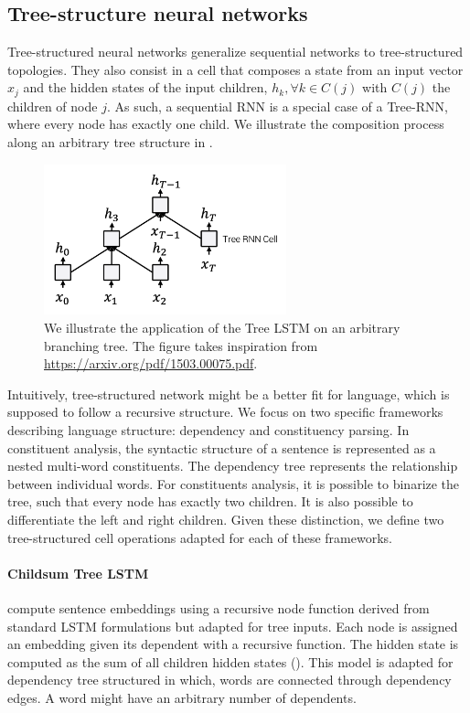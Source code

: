\subsection{Tree-structure neural networks}

Tree-structured neural networks generalize sequential networks to tree-structured topologies. They also consist in a cell that composes a state from an input vector $x_j$ and the hidden states of the input children, $h_k, \forall k \in C(j)$ with $C(j)$ the children of node $j$. As such, a sequential RNN is a special case of a Tree-RNN, where every node has exactly one child. We illustrate the composition process along an arbitrary tree structure in .

\begin{figure}[!ht]
	\includegraphics[width=7cm]{images/tree-lstm.png}
	\caption[Tree LSTM]{We illustrate the application of the Tree LSTM on an arbitrary branching tree. The figure takes inspiration from \url{https://arxiv.org/pdf/1503.00075.pdf}.}
\end{figure}

Intuitively, tree-structured network might be a better fit for language, which is supposed to follow a recursive structure. We focus on two specific frameworks describing language structure: dependency and constituency parsing. In constituent analysis, the syntactic structure of a sentence is represented as a nested multi-word constituents. The dependency tree represents the relationship between individual words. For constituents analysis, it is possible to binarize the tree, such that every node has exactly two children. It is also possible to differentiate the left and right children. Given these distinction, we define two tree-structured cell operations adapted for each of these frameworks.

\paragraph{Childsum Tree LSTM} \textcite{tai_15} compute sentence embeddings using a recursive node function derived from standard LSTM formulations but adapted for tree inputs. Each node is assigned an embedding given its dependent with a recursive function. The hidden state is computed as the sum of all children hidden states (). This model is adapted for dependency tree structured in which, words are connected through dependency edges. A word might have an arbitrary number of dependents.

